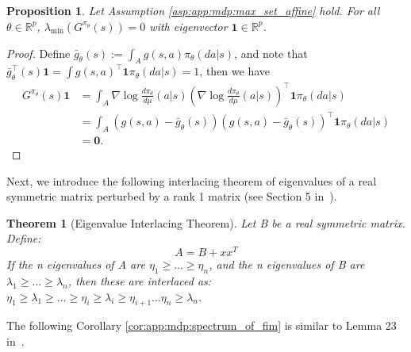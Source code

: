 \documentclass{amsart}
\newtheorem{theorem}{Theorem}
\newtheorem{proposition}{Proposition}
\theoremstyle{definition}
\begin{document}
\begin{proposition}\label{prp:app:mdp:singularity_of_fim_mdp_simplex}
Let Assumption \ref{asp:app:mdp:max_set_affine} hold.
For all $\theta \in \mathbb{R}^p$, $\lambda_{\min} (G^{\pi_\theta}(s)) = 0$ with eigenvector $\textbf{1} \in \mathbb{R}^p$.
\end{proposition}
\begin{proof}
Define $\bar{g}_\theta (s):= \int_A g(s,a) \pi_\theta(da|s)$, and note that $\bar{g}_\theta^\top (s)\textbf{1} = \int g(s,a)^\top \textbf{1}\pi_\theta(da|s) =1$, then we have
\begin{align*}
G^{\pi_\theta} (s)\textbf{1} &= \int_A \nabla\log\frac{d \pi_{\theta}}{d \mu}(a|s)\left(\nabla\log\frac{d \pi_{\theta}}{d \mu}(a|s)\right)^{\top} \textbf{1}\pi_\theta(da|s)\\
& = \int_A \left(g(s,a) - \bar{g}_\theta(s)\right)\left(g(s,a) - \bar{g}_\theta(s)\right)^{\top} \textbf{1}\pi_\theta(da|s)\\
& = \mathbf{0}.
\end{align*}
\end{proof}

Next, we introduce the following interlacing theorem of eigenvalues of a real symmetric matrix perturbed by a rank 1 matrix (see Section 5 in~\cite{4d2f28f8-3cb9-3c33-89f8-2a7e91475e75}).
\begin{theorem}[Eigenvalue Interlacing Theorem]\label{thm:app:bandit:Eigenvalue_Interlacing}
Let B be a real symmetric matrix. Define:
\[
A = B + xx^T
\]
If the n eigenvalues of A are $\eta_1 \ge \dots \ge \eta_n$, and the n eigenvalues of B are $\lambda_1 \ge \dots \ge \lambda_n$, then these are interlaced as: $\eta_1 \ge \lambda_1 \ge \dots \ge \eta_i \ge \lambda_i \ge \eta_{i+1} \dots \eta_n \ge \lambda_n$.
\end{theorem}

The following Corollary \ref{cor:app:mdp:spectrum_of_fim} is similar to Lemma 23 in~\cite{mei2020global}.
\end{document}
